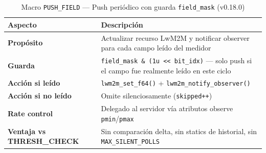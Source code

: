 \begin{table}[htbp]
\centering
\caption{Macro \texttt{PUSH\_FIELD} --- Push periódico con guarda \texttt{field\_mask} (v0.18.0)}
\label{tab:push_field_v018}
\begin{tabular}{@{}p{3.5cm}p{10cm}@{}}
\toprule
\textbf{Aspecto} & \textbf{Descripción} \\
\midrule
\textbf{Propósito} & Actualizar recurso LwM2M y notificar observer para cada campo leído del medidor \\
\textbf{Guarda} & \texttt{field\_mask \& (1u << bit\_idx)} --- solo push si el campo fue realmente leído en este ciclo \\
\textbf{Acción si leído} & \texttt{lwm2m\_set\_f64()} + \texttt{lwm2m\_notify\_observer()} \\
\textbf{Acción si no leído} & Omite silenciosamente (\texttt{skipped++}) \\
\textbf{Rate control} & Delegado al servidor vía atributos observe \texttt{pmin}/\texttt{pmax} \\
\textbf{Ventaja vs THRESH\_CHECK} & Sin comparación delta, sin statics de historial, sin \texttt{MAX\_SILENT\_POLLS} \\
\bottomrule
\end{tabular}
\end{table}
